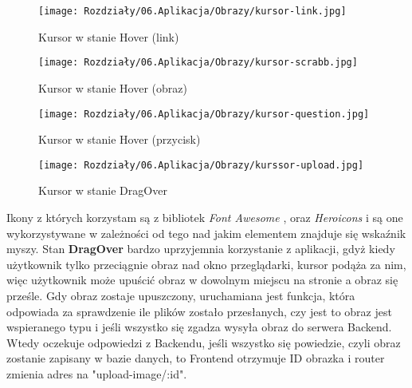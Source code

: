 \begin{figure}[ht]
    \centering
    \begin{minipage}[t]{0.47\linewidth}
        \texttt{[image: Rozdziały/06.Aplikacja/Obrazy/kursor-link.jpg]}
        \caption{Kursor w stanie Hover (link)}
        \label{fig:image89}
    \end{minipage}
    \hspace{0.5cm}
    \begin{minipage}[t]{0.47\linewidth}
        \texttt{[image: Rozdziały/06.Aplikacja/Obrazy/kursor-scrabb.jpg]}
        \caption{Kursor w stanie Hover (obraz)}
        \label{fig:image90}
    \end{minipage}
\end{figure}

\begin{figure}[ht]
    \centering
    \begin{minipage}[t]{0.47\linewidth}
        \texttt{[image: Rozdziały/06.Aplikacja/Obrazy/kursor-question.jpg]}
        \caption{Kursor w stanie Hover (przycisk)}
        \label{fig:image91}
    \end{minipage}
    \hspace{0.5cm}
    \begin{minipage}[t]{0.47\linewidth}
        \texttt{[image: Rozdziały/06.Aplikacja/Obrazy/kurssor-upload.jpg]}
        \caption{Kursor w stanie DragOver}
        \label{fig:image92}
    \end{minipage}
\end{figure}

Ikony z których korzystam są z bibliotek \textit{Font Awesome} \cite{fontawesome}, oraz \textit{Heroicons} \cite{heroicons} i są one wykorzystywane w zależności od tego nad jakim elementem znajduje się wskaźnik myszy.
Stan \textbf{DragOver} bardzo uprzyjemnia korzystanie z aplikacji, gdyż kiedy użytkownik tylko przeciągnie obraz nad okno przeglądarki, kursor podąża za nim, więc użytkownik może upuścić obraz w dowolnym miejscu na stronie a obraz się prześle.
\newpage
Gdy obraz zostaje upuszczony, uruchamiana jest funkcja, która odpowiada za sprawdzenie ile plików zostało przesłanych, czy jest to obraz jest wspieranego typu i jeśli wszystko się zgadza wysyła obraz do serwera Backend. Wtedy oczekuje odpowiedzi z Backendu, jeśli wszystko się powiedzie, czyli obraz zostanie zapisany w bazie danych, to Frontend otrzymuje ID obrazka i router zmienia adres na "upload-image/:id". 



